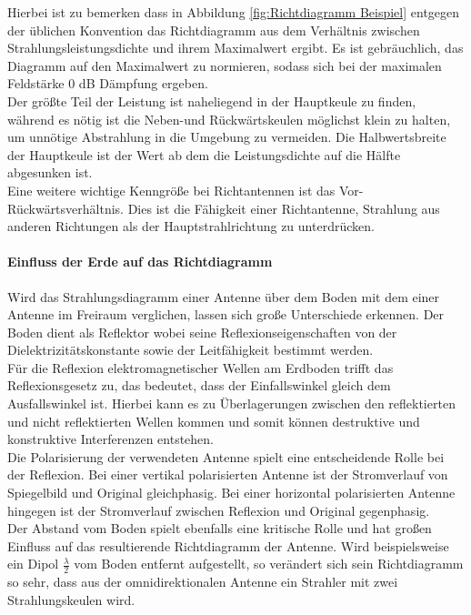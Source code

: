 Hierbei ist zu bemerken dass in Abbildung \ref{fig:Richtdiagramm Beispiel} entgegen der üblichen Konvention das Richtdiagramm aus dem Verhältnis zwischen Strahlungsleistungsdichte und ihrem Maximalwert ergibt. Es ist gebräuchlich, das Diagramm auf den Maximalwert zu normieren, sodass sich bei der maximalen Feldstärke 0 dB Dämpfung ergeben.\\
\newline
Der größte Teil der Leistung ist naheliegend in der Hauptkeule zu finden, während es nötig ist die Neben-und Rückwärtskeulen möglichst klein zu halten, um unnötige Abstrahlung in die Umgebung zu vermeiden. Die Halbwertsbreite der Hauptkeule ist der Wert ab dem die Leistungsdichte auf die Hälfte abgesunken ist.\\
\newline
Eine weitere wichtige Kenngröße bei Richtantennen ist das Vor-Rückwärtsverhältnis. Dies ist die Fähigkeit einer Richtantenne, Strahlung aus anderen Richtungen als der Hauptstrahlrichtung zu unterdrücken.

\paragraph{Einfluss der Erde auf das Richtdiagramm}
Wird das Strahlungsdiagramm einer Antenne über dem Boden mit dem einer Antenne im Freiraum verglichen, lassen sich große Unterschiede erkennen. Der Boden dient als Reflektor wobei seine Reflexionseigenschaften von der Dielektrizitätskonstante sowie der Leitfähigkeit bestimmt werden.\\
\newline
Für die Reflexion elektromagnetischer Wellen am Erdboden trifft das Reflexionsgesetz zu, das bedeutet, dass der Einfallswinkel gleich dem Ausfallswinkel ist. Hierbei kann es zu Überlagerungen zwischen den reflektierten und nicht reflektierten Wellen kommen und somit können destruktive und konstruktive Interferenzen entstehen.\\
\newline
Die Polarisierung der verwendeten Antenne spielt eine entscheidende Rolle bei der Reflexion. Bei einer vertikal polarisierten Antenne ist der Stromverlauf von Spiegelbild und Original gleichphasig. Bei einer horizontal polarisierten Antenne hingegen ist der Stromverlauf zwischen Reflexion und Original gegenphasig.\\
\newline
Der Abstand vom Boden spielt ebenfalls eine kritische Rolle und hat großen Einfluss auf das resultierende Richtdiagramm der Antenne. Wird beispielsweise ein Dipol $\frac{\lambda}{2}$ vom Boden entfernt aufgestellt, so verändert sich sein Richtdiagramm so sehr, dass aus der omnidirektionalen Antenne ein Strahler mit zwei Strahlungskeulen wird. 


